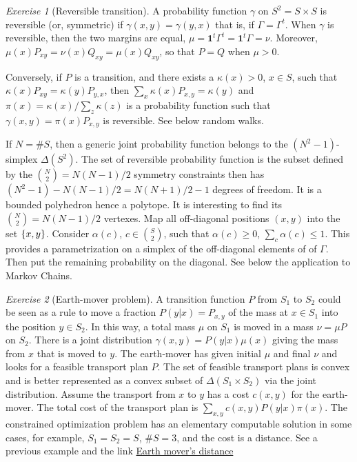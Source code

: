\documentclass[12pt,a4paper]{amsart}
\newcommand{\one}{\bm 1}
\theoremstyle{plain}%
\theoremstyle{definition}
\theoremstyle{remark}
\newtheorem{exercise}{Exercise}
\begin{document}
\begin{exercise}[Reversible transition]
  A probability function $\gamma$ on $S^2 = S \times S$ is reversible
  (or, symmetric) if $\gamma(x,y) = \gamma(y,x)$ that is, if
  $\Gamma = \Gamma^t$. When $\gamma$ is reversible, then the two
  margins are equal, $\mu = \one^t \Gamma^t = \one^t \Gamma =
  \nu$. Moreover, $\mu(x)P_{xy} = \nu(x) Q_{xy} = \mu(x)Q_{xy}$, so
  that $P=Q$ when $\mu > 0$.

  Conversely, if $P$ is a transition, and there exists a
  $\kappa(x) > 0$, $x \in S$, such that
  $\kappa(x) P_{xy} = \kappa(y)P_{y,x}$, then
  $\sum_x \kappa(x) P_{x,y} = \kappa(y)$ and
  $\pi(x) = \kappa(x) / \sum_z \kappa(z)$ is a probability function
  such that $\gamma(x,y) = \pi(x) P_{x,y}$ is reversible. See below
  random walks.

  If $N = \# S$, then a generic joint
  probability function belongs to the $(N^2-1)$-simplex
  $\Delta(S^2)$. The set of reversible probability function is the
  subset defined by the $\binom N 2 = N(N-1)/2$ symmetry constraints
  then has $(N^2-1) - N(N-1)/2 = N(N+1)/2-1$ degrees of freedom. It is
  a bounded polyhedron hence a polytope. It is interesting to find its
  $\binom {N} 2 = N(N-1)/2$ vertexes. Map all off-diagonal positions
  $(x,y)$ into the set $\left\{x,y\right\}$. Consider $\alpha(c)$,
  $c \in \binom S 2$, such that $\alpha(c) \geq 0$,
  $\sum_c \alpha(c) \leq 1$. This provides a parametrization on a
  simplex of the off-diagonal elements of of $\Gamma$. Then put the
  remaining probability on the diagonal.  See below the application to
  Markov Chains.\end{exercise}

\begin{exercise}[Earth-mover problem]
  A transition function $P$ from $S_1$ to $S_2$ could be seen as a
  rule to move a fraction $P(y|x) = P_{x,y}$ of the mass at
  $x \in S_1$ into the position $y \in S_2$. In this way, a total mass
  $\mu$ on $S_1$ is moved in a mass $\nu = \mu P$ on $S_2$. There is a
  joint distribution $\gamma(x,y) = P(y|x)\mu(x)$ giving the mass from
  $x$ that is moved to $y$. The earth-mover has given initial $\mu$
  and final $\nu$ and looks for a feasible transport plan $P$. The set
  of feasible transport plans is convex and is better represented as a
  convex subset of $\Delta(S_1 \times S_2)$ via the joint
  distribution. Assume the transport from $x$ to $y$ has a cost
  $c(x,y)$ for the earth-mover. The total cost of the transport plan
  is $\sum_{x,y} c(x,y)P(y|x)\pi(x)$. The constrained optimization
  problem has an elementary computable solution in some cases, for
  example, $S_1=S_2=S$, $\#S = 3$, and the cost is a distance. See a
  previous example and the link
  \href{https://en.wikipedia.org/wiki/Earth_mover's_distance}{Earth
    mover's distance}
\end{exercise}
  
\end{document}
